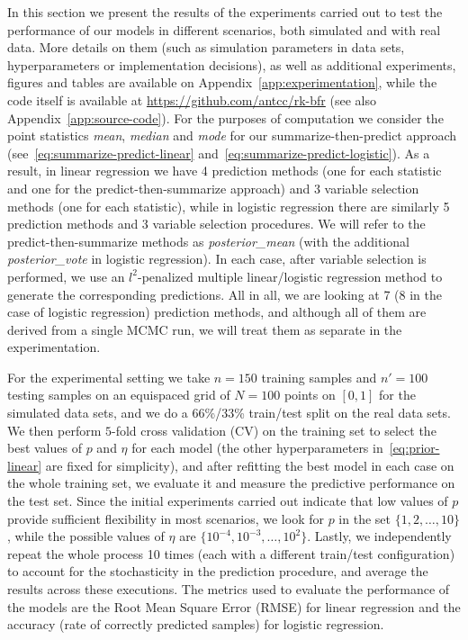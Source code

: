 \documentclass{article}
\numberwithin{equation}{section}
\theoremstyle{plain}
\begin{document}
In this section we present the results of the experiments carried out to test the performance of our models in different scenarios, both simulated and with real data. More details on them (such as simulation parameters in data sets, hyperparameters or implementation decisions), as well as additional experiments, figures and tables are available on Appendix~\ref{app:experimentation}, while the code itself is available at \url{https://github.com/antcc/rk-bfr} (see also Appendix~\ref{app:source-code}). For the purposes of computation we consider the point statistics \textit{mean}, \textit{median} and \textit{mode} for our summarize-then-predict approach (see~\eqref{eq:summarize-predict-linear} and~\eqref{eq:summarize-predict-logistic}). As a result, in linear regression we have 4 prediction methods (one for each statistic and one for the predict-then-summarize approach) and 3 variable selection methods (one for each statistic), while in logistic regression there are similarly 5 prediction methods and 3 variable selection procedures. We will refer to the predict-then-summarize methods as \textit{posterior\_mean} (with the additional \textit{posterior\_vote} in logistic regression). In each case, after variable selection is performed, we use an \(l^2\)-penalized multiple linear/logistic regression method to generate the corresponding predictions. All in all, we are looking at 7 (8 in the case of logistic regression) prediction methods, and although all of them are derived from a single MCMC run, we will treat them as separate in the experimentation.

For the experimental setting we take \(n=150\) training samples and \(n'=100\) testing samples on an equispaced grid of \(N=100\) points on \([0, 1]\) for the simulated data sets, and we do a 66\%/33\% train/test split on the real data sets. We then perform \(5\)-fold cross validation (CV) on the training set to select the best values of \(p\) and \(\eta\) for each model (the other hyperparameters in~\eqref{eq:prior-linear} are fixed for simplicity), and after refitting the best model in each case on the whole training set, we evaluate it and measure the predictive performance on the test set. Since the initial experiments carried out indicate that low values of \(p\) provide sufficient flexibility in most scenarios, we look for \(p\) in the set \(\{1,2,\dots,10\}\), while the possible values of \(\eta\) are \(\{10^{-4}, 10^{-3}, \dots, 10^2\}\). Lastly, we independently repeat the whole process 10 times (each with a different train/test configuration) to account for the stochasticity in the prediction procedure, and average the results across these executions. The metrics used to evaluate the performance of the models are the Root Mean Square Error (RMSE) for linear regression and the accuracy (rate of correctly predicted samples) for logistic regression.
\end{document}
